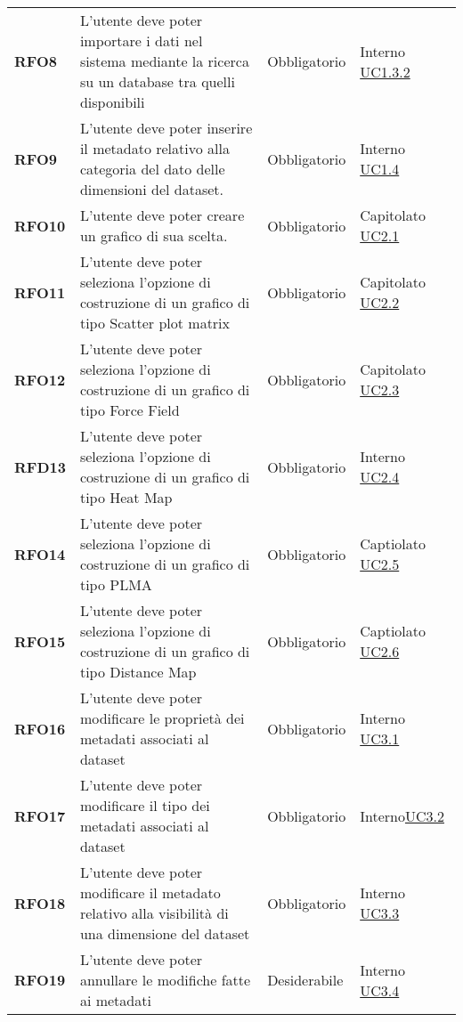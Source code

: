 \begin{longtable}[H]{>{\centering\bfseries}m{2cm} >{\centering}m{9cm} >{\centering}m{2.5cm} >{\centering\arraybackslash}m{2.5cm}}
    RFO8
    &   L'utente deve poter importare i dati nel sistema mediante la ricerca
        su un database tra quelli disponibili
    & Obbligatorio
    & Interno \hyperref[par:uc1.3.2]{UC1.3.2}\\

    RFO9
    &   L'utente deve poter inserire il metadato relativo alla categoria
        del dato delle dimensioni del dataset.
    & Obbligatorio
    & Interno \hyperref[ssub:uc1.4]{UC1.4}\\

    RFO10
    & L'utente deve poter creare un grafico di sua scelta.
    & Obbligatorio
    & Capitolato \hyperref[ssub:uc2.1]{UC2.1}\\

    RFO11
    & L'utente deve poter seleziona l'opzione di costruzione di un grafico di tipo Scatter plot matrix
    & Obbligatorio
    & Capitolato   \hyperref[ssub:uc2.2]{UC2.2}\\

    RFO12
    & L'utente deve poter seleziona l'opzione di costruzione di un grafico di tipo Force Field
    & Obbligatorio
    & Capitolato  \hyperref[ssub:uc2.3]{UC2.3}\\
    
    RFD13
    & L'utente deve poter seleziona l'opzione di costruzione di un grafico di tipo Heat Map
    & Obbligatorio
    & Interno  \hyperref[ssub:uc2.4]{UC2.4}\\

    RFO14
    & L'utente deve poter seleziona l'opzione di costruzione di un grafico di tipo PLMA
    & Obbligatorio
    & Captiolato   \hyperref[ssub:uc2.5]{UC2.5}\\

    RFO15
    & L'utente deve poter seleziona l'opzione di costruzione di un grafico di tipo Distance Map
    & Obbligatorio
    & Captiolato  \hyperref[ssub:UC2.6]{UC2.6}\\

    RFO16
    & L'utente deve poter modificare le proprietà dei metadati associati al dataset
    & Obbligatorio
    & Interno  \hyperref[ssub:uc3.1]{UC3.1} \\

    RFO17
    & L'utente deve poter modificare il tipo dei metadati associati al dataset
    & Obbligatorio
    & Interno\hyperref[sub:uc3.2]{UC3.2} \\

    RFO18
    & L'utente deve poter modificare il metadato relativo alla visibilità di una dimensione del dataset
    & Obbligatorio
    & Interno  \hyperref[sub:uc3.3]{UC3.3} \\

    RFO19
    & L'utente deve poter annullare le modifiche fatte ai metadati
    & Desiderabile
    & Interno  \hyperref[ssub:uc3.4]{UC3.4} \\

\end{longtable}